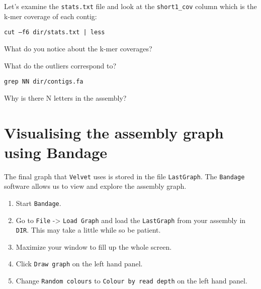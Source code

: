 \begin{steps}

Let's examine the \texttt{stats.txt} file and look at the \texttt{short1\_cov} column which is the k-mer coverage of each contig:
\begin{lstlisting}
cut –f6 dir/stats.txt | less
\end{lstlisting}
\end{steps}

\begin{questions}
What do you notice about the k-mer coverages?
\begin{answer}
\end{answer}
What do the outliers correspond to?
\begin{answer}
\end{answer}
\end{questions}

\begin{steps}
\begin{lstlisting}
grep NN dir/contigs.fa
\end{lstlisting}
\end{steps}

\begin{questions}
Why is there N letters in the assembly?
\begin{answer}
\end{answer}
\end{questions}

\section{Visualising the assembly graph using Bandage}

The final graph that \texttt{Velvet} uses is stored in the file \texttt{LastGraph}. The \texttt{Bandage} software allows us to view and explore the assembly graph.
\begin{steps}
\begin{enumerate}
\item Start \texttt{Bandage}.
\item Go to \texttt{File} -> \texttt{Load Graph} and load the \texttt{LastGraph} from your assembly in \texttt{DIR}. This may take a little while so be patient.
\item Maximize your window to fill up the whole screen.
\item Click \texttt{Draw graph} on the left hand panel.
\item Change \texttt{Random colours} to \texttt{Colour by read depth} on the left hand panel.
\end{enumerate}
\end{steps}

